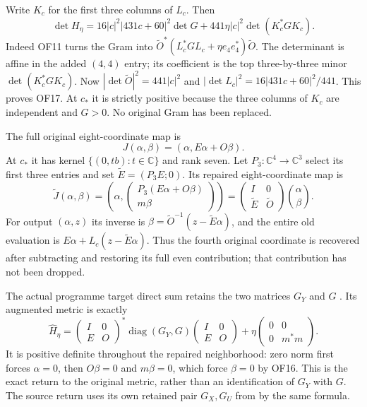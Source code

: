 \documentclass[11pt]{article}
\newcommand{\C}{\mathbb C}
\newcommand{\diag}{\operatorname{diag}}
\begin{document}
Write $K_c$ for the first three columns of $L_c$. Then
\begin{equation}
 \det H_\eta=16|c|^2|431c+60|^2\det G
       +441\eta|c|^2\det(K_c^*GK_c).\tag{OF17}
\end{equation}
Indeed OF11 turns the Gram into
$\widetilde O^*(L_c^*GL_c+\eta e_4e_4^*)\widetilde O$.
The determinant is affine in the added $(4,4)$ entry; its
coefficient is the top three-by-three minor $\det(K_c^*GK_c)$.
Now $|\det\widetilde O|^2=441|c|^2$ and
$|\det L_c|^2=16|431c+60|^2/441$. This proves OF17.
At $c_*$ it is strictly positive because the three columns of $K_c$
are independent and $G>0$. No original Gram has been replaced.

The full original eight-coordinate map is
\begin{equation}
 J(\alpha,\beta)=(\alpha,E\alpha+O\beta).
 \tag{OF18}
\end{equation}
At $c_*$ it has kernel $\{(0,tb):t\in\C\}$ and rank seven.
Let $P_3:\C^4\to\C^3$ select its first three entries and set
$\widetilde E=(P_3E;0)$. Its repaired eight-coordinate map is
\begin{equation}
 \widetilde J(\alpha,\beta)
 =\left(\alpha,\begin{pmatrix}P_3(E\alpha+O\beta)\\m\beta\end{pmatrix}\right)
 =\begin{pmatrix}I&0\\\widetilde E&\widetilde O\end{pmatrix}
   \binom\alpha\beta.\tag{OF19}
\end{equation}
For output $(\alpha,z)$ its inverse is
$\beta=\widetilde O^{-1}(z-\widetilde E\alpha)$, and the entire
old evaluation is $E\alpha+L_c(z-\widetilde E\alpha)$.
Thus the fourth original coordinate is recovered after subtracting
and restoring its full even contribution; that contribution has
not been dropped.

The actual programme target direct sum retains the two matrices
$G_Y$ and $G$ \cite[RW14]{Fable}. Its augmented metric is exactly
\begin{equation}
 \widehat H_\eta=
 \begin{pmatrix}I&0\\E&O\end{pmatrix}^{\!*}
 \diag(G_Y,G)
 \begin{pmatrix}I&0\\E&O\end{pmatrix}
 +\eta\begin{pmatrix}0&0\\0&m^*m\end{pmatrix}.
 \tag{OF20}
\end{equation}
It is positive definite throughout the repaired neighborhood:
zero norm first forces $\alpha=0$, then $O\beta=0$ and
$m\beta=0$, which force $\beta=0$ by OF16. This is the exact
return to the original metric, rather than an identification of
$G_Y$ with $G$. The source return uses its own retained pair
$G_X,G_U$ from \cite[RW19]{Fable} by the same formula.
\end{document}
